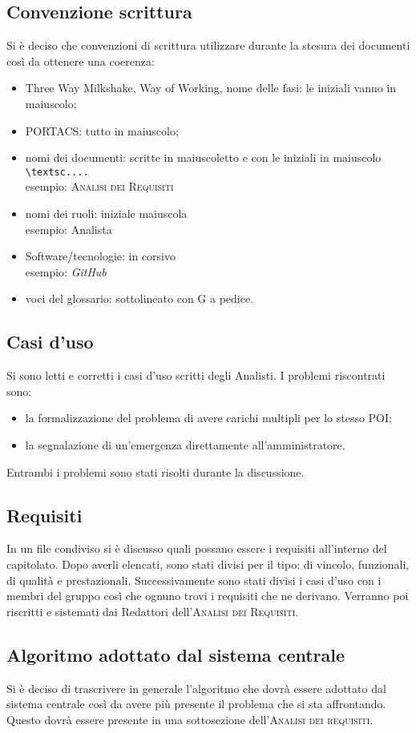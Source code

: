 \subsection{Convenzione scrittura}
Si è deciso che convenzioni di scrittura utilizzare durante la stesura dei documenti così da ottenere una coerenza:
\begin{itemize}
\item Three Way Milkshake, Way of Working, nome delle fasi: le iniziali vanno in maiuscolo;
\item PORTACS: tutto in maiuscolo;
\item nomi dei documenti: scritte in maiuscoletto e con le iniziali in maiuscolo \texttt{\textbackslash textsc{....}} \\esempio: \textsc{Analisi dei Requisiti}
\item nomi dei ruoli: iniziale maiuscola 
\\esempio: Analista
\item Software/tecnologie: in corsivo 
\\esempio: \textit{GitHub}
\item voci del glossario: sottolineato con G a pedice.
\end{itemize}

\subsection{Casi d'uso}
Si sono letti e corretti i casi d'uso scritti degli Analisti. I problemi riscontrati sono:
\begin{itemize}
	\item la formalizzazione del problema di avere carichi multipli per lo stesso POI;
	\item la segnalazione di un'emergenza direttamente all'amministratore.
\end{itemize}
Entrambi i problemi sono stati risolti durante la discussione.

\subsection{Requisiti}
In un file condiviso si è discusso quali possano essere i requisiti all'interno del capitolato. Dopo averli elencati, sono stati divisi per il tipo: di vincolo, funzionali, di qualità e prestazionali. Successivamente sono stati divisi i casi d'uso con i membri del gruppo così che ognuno trovi i requisiti che ne derivano. Verranno poi riscritti e sistemati dai Redattori dell'\textsc{Analisi dei Requisiti}.

\subsection{Algoritmo adottato dal sistema centrale}
Si è deciso di trascrivere in generale l'algoritmo che dovrà essere adottato dal sistema centrale così da avere più presente il problema che si sta affrontando. Questo dovrà essere presente in una sottosezione dell'\textsc{Analisi dei requisiti}. 
